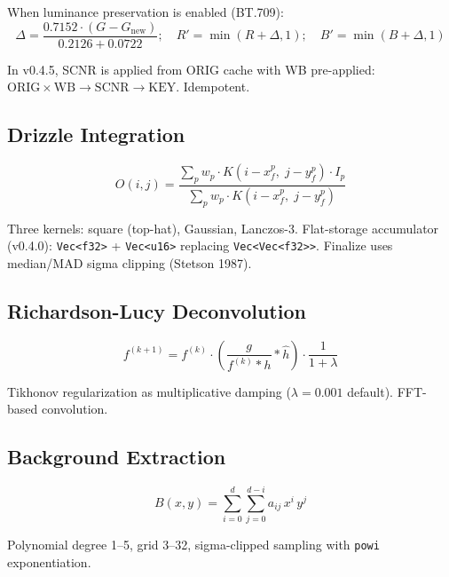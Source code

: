 \documentclass[11pt,a4paper]{article}
\newcommand{\code}[1]{\texttt{\small #1}}
\begin{document}
    When luminance preservation is enabled (BT.709):
    \begin{equation}
        \Delta = \frac{0.7152 \cdot (G - G_{\text{new}})}{0.2126 + 0.0722}; \quad R' = \min(R + \Delta, 1); \quad B' = \min(B + \Delta, 1)
    \end{equation}

    In v0.4.5, SCNR is applied from ORIG cache with WB pre-applied: $\text{ORIG} \times \text{WB} \to \text{SCNR} \to \text{KEY}$. Idempotent.

    \subsection{Drizzle Integration}
    \label{sec:drizzle}

    \begin{equation}
        O(i, j) = \frac{\sum_p w_p \cdot K(i - x_f^p,\; j - y_f^p) \cdot I_p}{\sum_p w_p \cdot K(i - x_f^p,\; j - y_f^p)}
    \end{equation}

    Three kernels: square (top-hat), Gaussian, Lanczos-3. Flat-storage accumulator (v0.4.0): \code{Vec<f32>} + \code{Vec<u16>} replacing \code{Vec<Vec<f32>>}. Finalize uses median/MAD sigma clipping (Stetson 1987).

    \subsection{Richardson-Lucy Deconvolution}
    \label{sec:rl_deconv}

    \begin{equation}
        f^{(k+1)} = f^{(k)} \cdot \left( \frac{g}{f^{(k)} * h} * \hat{h} \right) \cdot \frac{1}{1 + \lambda}
    \end{equation}

    Tikhonov regularization as multiplicative damping ($\lambda = 0.001$ default). FFT-based convolution.

    \subsection{Background Extraction}

    \begin{equation}
        B(x, y) = \sum_{i=0}^{d} \sum_{j=0}^{d-i} a_{ij} \, x^i \, y^j
    \end{equation}

    Polynomial degree 1--5, grid 3--32, sigma-clipped sampling with \code{powi} exponentiation.
\end{document}
